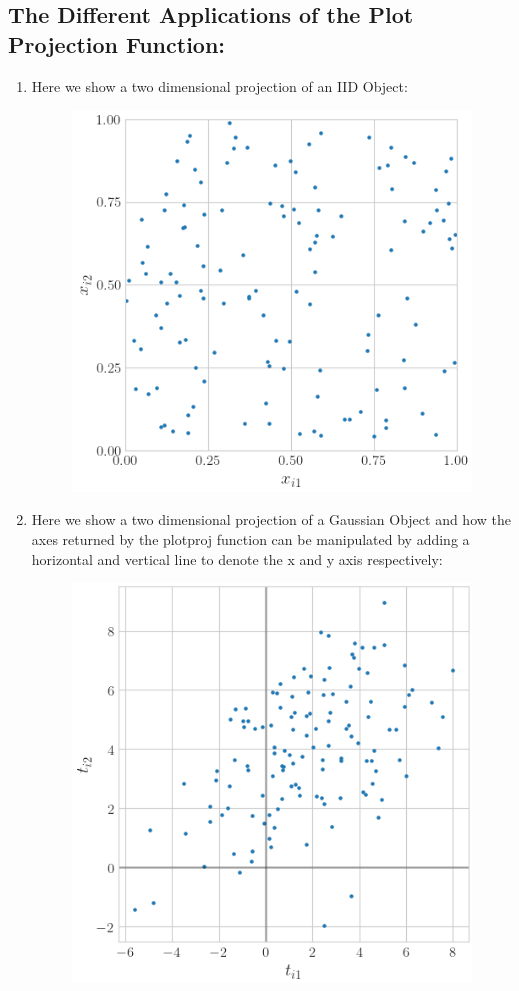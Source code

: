  \subsection*{The Different Applications of the Plot Projection Function:}
 \begin{enumerate}
     \item Here we show a two dimensional projection of an IID Object:
     
     \begin{figure}[H]
    \centering
    \includegraphics[width=0.55\linewidth]{PlotProjectionsFunction/Figures/iid.png}
    \end{figure}
    \item Here we show a two dimensional projection of a Gaussian Object and how the axes returned by the plot\textunderscore proj function can be manipulated by adding a horizontal and vertical line to denote the x and y axis respectively:
    
     \begin{figure}[H]
    \centering
    \includegraphics[width=0.55\linewidth]{PlotProjectionsFunction/Figures/iid_gaussian.png}

\end{figure}
\end{enumerate}
